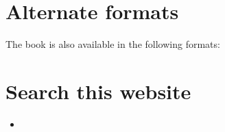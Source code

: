 \documentclass[letterpaper,10pt,english]{sphinxmanual}
\begin{document}
\chapter{Alternate formats}
\label{index:alternate-formats}
The book is also available in the following formats:


\chapter{Search this website}
\label{index:search-this-website}\begin{itemize}
\item {} 

\end{itemize}



\renewcommand{\indexname}{Index}
\printindex
\end{document}
